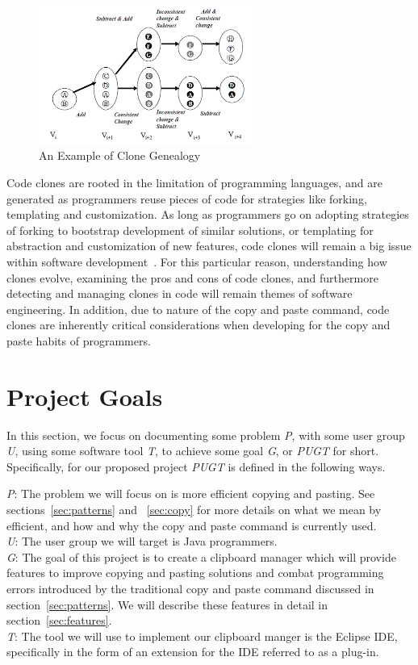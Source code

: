 \documentclass{acm_proc_article-sp}
\begin{document}
\begin{figure}[h]
\centering
\includegraphics[width=7cm]{genealogy}
\caption{An Example of Clone Genealogy}
\label{fig:genea}
\end{figure}

Code clones are rooted in the limitation of programming languages, and are generated as programmers reuse pieces of code for strategies like forking, templating and customization. As long as programmers go on adopting strategies of forking to bootstrap development of similar solutions, or templating for abstraction and customization of new features, code clones will remain a big issue within software development~\cite{frontiers}. For this particular reason, understanding how clones evolve, examining the pros and cons of code clones, and furthermore detecting and managing clones in code will remain themes of software engineering. In addition, due to nature of the copy and paste command, code clones are inherently critical considerations when developing for the copy and paste habits of programmers.

\section{Project Goals}\label{sec:goals}

In this section, we focus on documenting some problem \textit{P}, with some user group \textit{U}, using some software tool \textit{T}, to achieve some goal \textit{G}, or \textit{PUGT} for short. Specifically, for our proposed project \textit{PUGT} is defined in the following ways.

\textit{P}: The problem we will focus on is more efficient copying and pasting. See sections~\ref{sec:patterns} and ~\ref{sec:copy} for more details on what we mean by efficient, and how and why the copy and paste command is currently used.\\
\textit{U}: The user group we will target is Java programmers.\\
\textit{G}: The goal of this project is to create a clipboard manager which will provide features to improve copying and pasting solutions and combat programming errors introduced by the traditional copy and paste command discussed in section~\ref{sec:patterns}. We will describe these features in detail in section~\ref{sec:features}.\\
\textit{T}: The tool we will use to implement our clipboard manger is the Eclipse IDE, specifically in the form of an extension for the IDE referred to as a plug-in.
\end{document}
